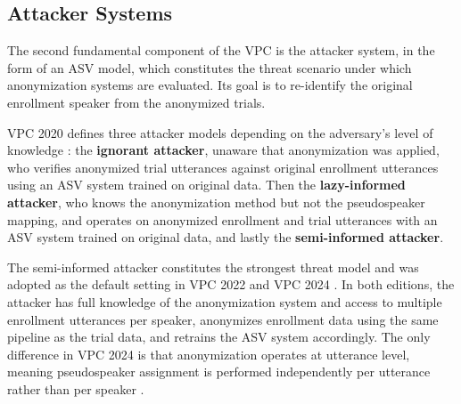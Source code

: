 \documentclass[12pt,leqno,a4paper]{article}
\begin{document}
\subsection{Attacker Systems}
The second fundamental component of the VPC is the attacker system, 
in the form of an ASV model, which constitutes the threat scenario 
under which anonymization systems are evaluated. Its goal is to 
re-identify the original enrollment speaker from the anonymized trials.

VPC 2020 defines three attacker models depending on the adversary's 
level of knowledge \citep{tomashenko_voiceprivacy_nodate, 
tomashenko_voiceprivacy_2022-1}: the \textbf{ignorant attacker}, 
unaware that anonymization was applied, who verifies anonymized trial 
utterances against original enrollment utterances using an ASV system 
trained on original data. Then the \textbf{lazy-informed attacker}, who 
knows the anonymization method but not the pseudospeaker mapping, 
and operates on anonymized enrollment and trial utterances with an 
ASV system trained on original data, and lastly the \textbf{semi-informed 
attacker}.

The semi-informed attacker constitutes the strongest threat model and 
was adopted as the default setting in VPC 2022 and VPC 2024 
\citep{tomashenko_voiceprivacy_pdf_nodate, 
tomashenko_voiceprivacy_2022-1}. In both editions, the attacker has 
full knowledge of the anonymization system and access to multiple 
enrollment utterances per speaker, anonymizes enrollment data using 
the same pipeline as the trial data, and retrains the ASV system 
accordingly. The only difference in VPC 2024 is that anonymization 
operates at utterance level, meaning pseudospeaker assignment is 
performed independently per utterance rather than per speaker 
\citep{tomashenko2024voiceprivacy2024challengeevaluation}.


\end{document}
